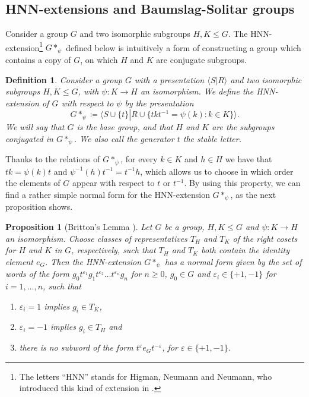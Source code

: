 \documentclass[cupthm,crop,info]{CUP-JNL-ETS}%
\theoremstyle{cupplain}
\newtheorem{proposition}[theorem]{Proposition}
\theoremstyle{cupdefinition}
\newtheorem{definition}{Definition}[section]
\theoremstyle{cupremark}
\theoremstyle{cupproof}
\numberwithin{equation}{section}
\begin{document}

\subsection{HNN-extensions and Baumslag-Solitar groups}
Consider a group $G$ and two isomorphic subgroups $H,K\le G$. The HNN-extension\footnote{The letters ``HNN'' stands for Higman, Neumann and Neumann, who introduced this kind of extension in \cite{HNN49}.} $G*_{\psi}$ defined below is intuitively a form of constructing a group which contains a copy of $G$, on which $H$ and $K$ are conjugate subgroups.

\begin{definition}\label{definition.hnn_extension} Consider a group $G$ with a presentation $\langle S\left|\right. R\rangle$ and two isomorphic subgroups $H,K\le G$, with $\psi:K\to H$ an isomorphism. We define the \textit{HNN-extension} of $G$ with respect to $\psi$ by the presentation
	$$
	G*_{\psi}\coloneqq \langle S\cup\{t\} \left|\right. R\cup \{t k t^{-1}=\psi(k): k\in K \} \rangle.
	$$
	We will say that $G$ is the \textit{base group}, and that $H$ and $K$ are the subgroups conjugated in $G*_{\psi}$. We also call the generator $t$ the \textit{stable letter}.
\end{definition}
Thanks to the relations of $G*_{\psi}$, for every $k\in K$ and $h\in H$ we have that $tk=\psi(k)t$ and $\psi^{-1}(h)t^{-1}=t^{-1}h$, which allows us to choose in which order the elements of $G$ appear with respect to $t$ or $t^{-1}$. By using this property, we can find a rather simple normal form for the HNN-extension $G*_{\psi}$, as the next proposition shows.

\begin{proposition}[Britton's Lemma {\cite[Theorem~IV.2.1]{lyndon_schupp_1977}}] \label{prop:hnn_general_normal_form}Let $G$ be a group, $H,K\le G$ and $\psi:K\to H$ an isomorphism. 
	Choose classes of representatives $T_H$ and $T_K$ of the right cosets for $H$ and $K$ in $G$, respectively, such that $T_H$ and $T_K$ both contain the identity element $e_G$. Then the HNN-extension $G*_\psi$ has a normal form given by the set of words of the form $g_0t^{\varepsilon_1}g_1t^{\varepsilon_2}\ldots t^{\varepsilon_n}g_n$ for $n\ge 0$, $g_0\in G$ and $\varepsilon_i\in \{+1,-1\}$ for $i=1,\ldots,n$, such that
	\begin{enumerate}
		\item $\varepsilon_i=1 $ implies $g_i\in T_K$,
		\item $\varepsilon_i=-1$ implies $g_i\in T_H$ and 
		\item there is no subword of the form $t^\varepsilon e_G t^{-\varepsilon}$, for $\varepsilon\in\{+1,-1\}$.
	\end{enumerate} 
\end{proposition}
\end{document}
